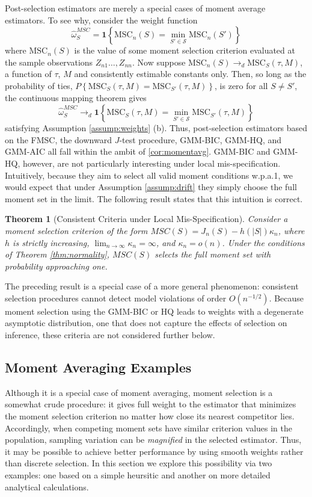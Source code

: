 \documentclass[12pt]{article}
\newtheorem{thm}{Theorem}[section]
\theoremstyle{definition}
\begin{document}
Post-selection estimators are merely a special cases of moment average estimators.
To see why, consider the weight function
$$\widehat{\omega}_S^{MSC} = \mathbf{1}\left\{\mbox{MSC}_n(S) = \min_{S'\in \mathscr{S}} \mbox{MSC}_n(S')\right\}$$where $\mbox{MSC}_n(S)$ is the value of some moment selection criterion evaluated at the sample observations $Z_{n1}\hdots, Z_{nn}$. 
Now suppose $\mbox{MSC}_n(S) \rightarrow_d\mbox{MSC}_S(\tau,M)$, a function of $\tau$, $M$ and consistently estimable constants only. 
Then, so long as the probability of ties, $P\left\{\mbox{MSC}_S(\tau,M) = \mbox{MSC}_{S'}(\tau,M) \right\}$, is zero for all $S\neq S'$, the continuous mapping theorem gives 
	$$\widehat{\omega}_S^{MSC} \rightarrow_d \mathbf{1}\left\{\mbox{MSC}_S(\tau,M) = \min_{S'\in \mathscr{S}} \mbox{MSC}_{S'}(\tau,M)\right\}$$ 
satisfying Assumption \ref{assump:weights} (b). 
Thus, post-selection estimators based on the FMSC, the downward $J$-test procedure, GMM-BIC, GMM-HQ, and GMM-AIC all fall within the ambit of \ref{cor:momentavg}. 
GMM-BIC and GMM-HQ, however, are not particularly interesting under local mis-specification.
Intuitively, because they aim to select all valid moment conditions w.p.a.1, we would expect that under Assumption \ref{assump:drift} they simply choose the full moment set in the limit. 
The following result states that this intuition is correct. 
\begin{thm}[Consistent Criteria under Local Mis-Specification]
\label{pro:andrews}
Consider a moment selection criterion of the form $MSC(S) = J_n(S) - h(|S|)\kappa_n$, where $h$ is strictly increasing,  $\lim_{n\rightarrow \infty}\kappa_n = \infty$, and $\kappa_n = o(n)$. Under the conditions of Theorem \ref{thm:normality}, $MSC(S)$ selects the full moment set with probability approaching one.
\end{thm}
The preceding result is a special case of a more general phenomenon: consistent selection procedures cannot detect model violations of order $O(n^{-1/2})$.
Because moment selection using the GMM-BIC or HQ leads to weights with a degenerate asymptotic distribution, one that does not capture the effects of selection on inference, these criteria are not considered further below. 

\subsection{Moment Averaging Examples}
Although it is a special case of moment averaging, moment selection is a somewhat crude procedure: it gives full weight to the estimator that minimizes the moment selection criterion no matter how close its nearest competitor lies. 
Accordingly, when competing moment sets have similar criterion values in the population, sampling variation can be \emph{magnified} in the selected estimator. 
Thus, it may be possible to achieve better performance by using smooth weights rather than discrete selection.
In this section we explore this possibility via two examples: one based on a simple heursitic and another on more detailed analytical calculations.
\end{document}
